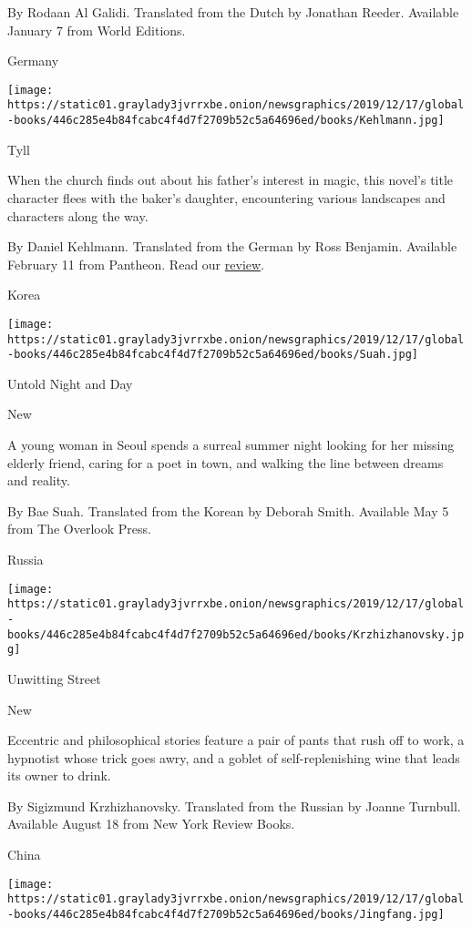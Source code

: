  By Rodaan Al Galidi. Translated from the Dutch by Jonathan Reeder.
Available January 7 from World Editions.

Germany

\texttt{[image: https://static01.graylady3jvrrxbe.onion/newsgraphics/2019/12/17/global-books/446c285e4b84fcabc4f4d7f2709b52c5a64696ed/books/Kehlmann.jpg]}

Tyll

When the church finds out about his father's interest in magic, this
novel's title character flees with the baker's daughter, encountering
various landscapes and characters along the way.

 By Daniel Kehlmann. Translated from the German by Ross Benjamin.
Available February 11 from Pantheon. Read our
\href{https://www.nytimes3xbfgragh.onion/2020/02/11/books/review/tyll-daniel-kehlmann.html}{review}.

Korea

\texttt{[image: https://static01.graylady3jvrrxbe.onion/newsgraphics/2019/12/17/global-books/446c285e4b84fcabc4f4d7f2709b52c5a64696ed/books/Suah.jpg]}

Untold Night and Day

New

A young woman in Seoul spends a surreal summer night looking for her
missing elderly friend, caring for a poet in town, and walking the line
between dreams and reality.

 By Bae Suah. Translated from the Korean by Deborah Smith. Available May
5 from The Overlook Press.

Russia

\texttt{[image: https://static01.graylady3jvrrxbe.onion/newsgraphics/2019/12/17/global-books/446c285e4b84fcabc4f4d7f2709b52c5a64696ed/books/Krzhizhanovsky.jpg]}

Unwitting Street

New

Eccentric and philosophical stories feature a pair of pants that rush
off to work, a hypnotist whose trick goes awry, and a goblet of
self-replenishing wine that leads its owner to drink.

 By Sigizmund Krzhizhanovsky. Translated from the Russian by Joanne
Turnbull. Available August 18 from New York Review Books.

China

\texttt{[image: https://static01.graylady3jvrrxbe.onion/newsgraphics/2019/12/17/global-books/446c285e4b84fcabc4f4d7f2709b52c5a64696ed/books/Jingfang.jpg]}

